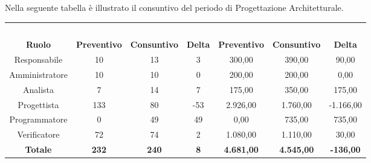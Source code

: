 Nella seguente tabella è illustrato il consuntivo del periodo di Progettazione Architetturale.


\begin{tabular}{c|ccc|ccc}
\rowcolor{greySWEight}
\multicolumn{1}{c}{} & \multicolumn{3}{c}{\textcolor{white}{\textbf{Ore}}} & \multicolumn{3}{c}{\textcolor{white}{\textbf{Costo in Euro}}} \\
{\textbf{Ruolo}} & {\textbf{Preventivo}} & {\textbf{Consuntivo}} & {\textbf{Delta}} & {\textbf{Preventivo}} & {\textbf{Consuntivo}} & {\textbf{Delta}} \\
Responsabile & 10 & 13 & 3 & 300,00 & 390,00 & 90,00 \\
Amministratore & 10 & 10 & 0 & 200,00 & 200,00 & 0,00 \\
Analista & 7 & 14 & 7 & 175,00 & 350,00 & 175,00 \\
Progettista & 133 & 80 & -53 & 2.926,00 & 1.760,00 & -1.166,00 \\
Programmatore & 0 & 49 & 49 & 0,00 & 735,00 & 735,00 \\
Verificatore & 72 & 74 & 2 & 1.080,00 & 1.110,00 & 30,00 \\
\hline
\textbf{Totale} & \textbf{232} & \textbf{240} & \textbf{8} & \textbf{4.681,00} & \textbf{4.545,00} & \textbf{-136,00} \\
\end{tabular}
